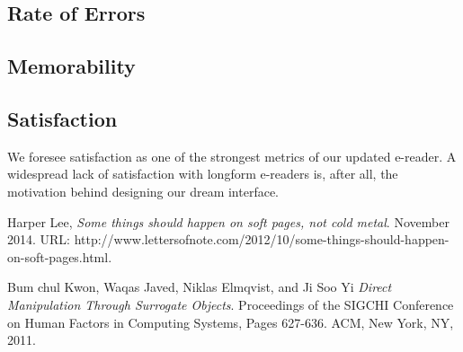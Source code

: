 \documentclass[11pt, oneside]{article}   	%
\begin{document}
\subsection {Rate of Errors}
\subsection {Memorability}
\subsection {Satisfaction}
We foresee satisfaction as one of the strongest metrics of our updated e-reader. A widespread lack of satisfaction with longform e-readers is, after all, the motivation behind designing our dream interface.

\begin{thebibliography}{9}

  Harper Lee,
  \emph{Some things should happen on soft pages, not cold metal}.
  November 2014.
  URL: http://www.lettersofnote.com/2012/10/some-things-should-happen-on-soft-pages.html.
  
  Bum chul Kwon, Waqas Javed, Niklas Elmqvist, and Ji Soo Yi
  \emph{Direct Manipulation Through Surrogate Objects}.
  Proceedings of the SIGCHI Conference on Human Factors in Computing Systems,
  Pages 627-636.
  ACM, New York, NY,
  2011.

\end{thebibliography}
\end{document}
